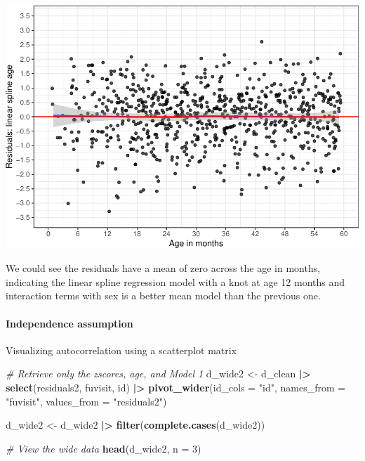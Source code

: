 \documentclass[
]{article}
\newenvironment{Shaded}{\begin{snugshade}}{\end{snugshade}}
\newcommand{\AttributeTok}[1]{\textcolor[rgb]{0.13,0.29,0.53}{#1}}
\newcommand{\CommentTok}[1]{\textcolor[rgb]{0.56,0.35,0.01}{\textit{#1}}}
\newcommand{\DecValTok}[1]{\textcolor[rgb]{0.00,0.00,0.81}{#1}}
\newcommand{\FunctionTok}[1]{\textcolor[rgb]{0.13,0.29,0.53}{\textbf{#1}}}
\newcommand{\NormalTok}[1]{#1}
\newcommand{\OtherTok}[1]{\textcolor[rgb]{0.56,0.35,0.01}{#1}}
\newcommand{\SpecialCharTok}[1]{\textcolor[rgb]{0.81,0.36,0.00}{\textbf{#1}}}
\newcommand{\StringTok}[1]{\textcolor[rgb]{0.31,0.60,0.02}{#1}}
\begin{document}
\includegraphics{ProblemSet3_Siyu_Zou_files/figure-latex/unnamed-chunk-14-1.pdf}

We could see the residuals have a mean of zero across the age in months,
indicating the linear spline regression model with a knot at age 12
months and interaction terms with sex is a better mean model than the
previous one.

\hypertarget{independence-assumption-1}{%
\paragraph{Independence assumption}\label{independence-assumption-1}}

Visualizing autocorrelation using a scatterplot matrix

\begin{Shaded}
\begin{Highlighting}[]
\CommentTok{\# Retrieve only the zscores, age, and Model 1}
\NormalTok{d\_wide2 }\OtherTok{\textless{}{-}}\NormalTok{ d\_clean }\SpecialCharTok{|\textgreater{}}
  \FunctionTok{select}\NormalTok{(residuals2, fuvisit, id) }\SpecialCharTok{|\textgreater{}}
  \FunctionTok{pivot\_wider}\NormalTok{(}\AttributeTok{id\_cols =} \StringTok{"id"}\NormalTok{,}
              \AttributeTok{names\_from =} \StringTok{"fuvisit"}\NormalTok{,}
              \AttributeTok{values\_from =} \StringTok{"residuals2"}\NormalTok{)}

\NormalTok{d\_wide2 }\OtherTok{\textless{}{-}}\NormalTok{ d\_wide2 }\SpecialCharTok{|\textgreater{}}
  \FunctionTok{filter}\NormalTok{(}\FunctionTok{complete.cases}\NormalTok{(d\_wide2))}

\CommentTok{\# View the wide data}
\FunctionTok{head}\NormalTok{(d\_wide2, }\AttributeTok{n =} \DecValTok{3}\NormalTok{)}
\end{Highlighting}
\end{Shaded}
\end{document}
